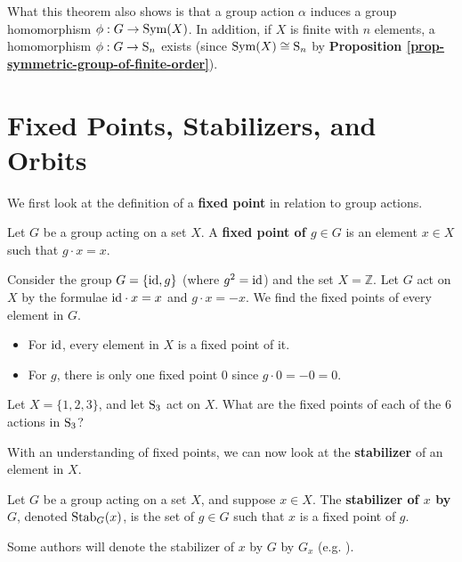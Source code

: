 \begin{remark}
    What this theorem also shows is that a group action $\alpha$ induces a group homomorphism $\phi: G \to \mathrm{Sym}(X)$. In addition, if $X$ is finite with $n$ elements, a homomorphism $\phi: G \to \mathrm{S}_{n}$ exists (since $\mathrm{Sym}(X) \cong \mathrm{S}_{n}$ by \textbf{Proposition \ref{prop-symmetric-group-of-finite-order}}).
\end{remark}

\section{Fixed Points, Stabilizers, and Orbits}
We first look at the definition of a \textbf{fixed point} in relation to group actions.

\begin{definition}
    Let $G$ be a group acting on a set $X$. A \textbf{fixed point of $g \in G$} is an element $x \in X$ such that $g\cdot x = x$.
\end{definition}

\begin{example}
    Consider the group $G = \{\mathrm{id}, g\}$ (where $g^2 = \mathrm{id}$) and the set $X = \mathbb{Z}$. Let $G$ act on $X$ by the formulae $\mathrm{id}\cdot x = x$ and $g\cdot x = -x$. We find the fixed points of every element in $G$.
    \begin{itemize}
        \item For $\mathrm{id}$, every element in $X$ is a fixed point of it.
        \item For $g$, there is only one fixed point 0 since $g\cdot 0 = -0 = 0$.
    \end{itemize}
\end{example}

\begin{exercise}
    Let $X = \{1, 2, 3\}$, and let $\mathrm{S}_{3}$ act on $X$. What are the fixed points of each of the 6 actions in $\mathrm{S}_{3}$?
\end{exercise}

With an understanding of fixed points, we can now look at the \textbf{stabilizer} of an element in $X$.

\begin{definition}
    Let $G$ be a group acting on a set $X$, and suppose $x \in X$. The \textbf{stabilizer of $x$ by $G$}, denoted $\mathrm{Stab}_{G}(x)$, is the set of $g \in G$ such that $x$ is a fixed point of $g$.
\end{definition}
\begin{remark}
    Some authors will denote the stabilizer of $x$ by $G$ by $G_x$ (e.g. \cite{clark_1984, humphreys_1996, brilliant_groupactions}).
\end{remark}

